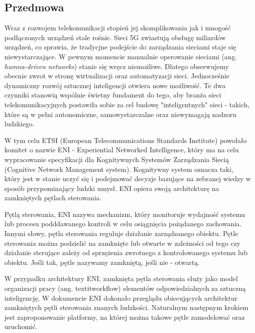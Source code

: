 \subsection{Przedmowa}

Wraz z rozwojem telekomunikacji stopień jej skomplikowania jak i mnogość podłączonych urządzeń stale rośnie. Sieci 5G zwiastują obsługę miliardów urządzeń, co sprawia, że tradycjne podejście do zarządzania sieciami staje się niewystarczające. W pewnym momencie manualnie operowanie sieciami (ang. \textit{humna-driven networks}) stanie się wręcz niemożliwe. Dlatego obserwujemy obecnie zwrot w stronę wirtualizacji oraz automatyzacji sieci. Jednocześnie dynamiczny rozwój sztucznej inteligencji otwiera nowe możliwość. Te dwa czynniki stanowią wspólnie świetny fundament do tego, aby branża sieci telekomunikacyjnych postawiła sobie za cel budowę "inteligentnych" sieci - takich, które są w pełni autonomiczne, samowystarczalne oraz niewymagają nadzoru ludzkiego. 

W tym celu ETSI (European Telecommunications Standards Institute) powołało komitet o nazwie ENI - Experiential Networked Intelligence, który ma na celu wypracowanie specyfikacji dla Kognitywnych Systemów Zarządzania Siecią (Cognitive Network Management system). Kognitywny system oznacza taki, który jest w stanie uczyć się i podejmować decyzje bazujące na zebranej wiedzy w sposób przypominający ludzki umysł. ENI opiera swoją architekturę na zamkniętych pętlach sterowania.

Pętlą sterowania, ENI nazywa mechanizm, który monitoruje wydajność systemu lub procesu podddawanego kontroli w celu osiągnięcia pożądanego zachowania. Innymi słowy, pętla sterowania reguluje działanie zarządzanego obiektu. Pętle sterowania można podzielić na zamknięte lub otwarte w zależności od tego czy działanie sterujące zależy od sprzężenia zwrotnego z kontrolowanego systemu lub obiektu. Jeśli tak, pętle nazywamy zamkniętą, jeśli nie - otwartą. 

W przypadku architektury ENI, zamknięta pętla sterowania służy jako model organizacji pracy (ang. textit{workflow}) elementów odpowiedzialnych za sztuczną inteligencję. W dokumencie \cite*{enioverview} ENI dokonało przeglądu obiecujących architektur zamkniętych pętli sterowania znanych ludzkości. Naturalnym następnym krokiem jest zaproponowanie platformy, na której można takowe pętle zamodelować oraz uruchomić. 